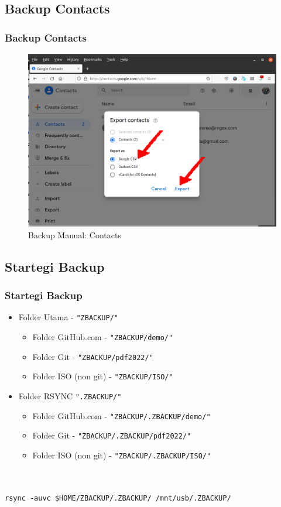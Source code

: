 \documentclass[xcolor=table, notheorems, hyperref={pdfpagelabels=false}]{beamer}
\begin{document}
\begin{frame}[fragile]
\section{Backup Contacts}
\frametitle{Backup Contacts}
\begin{figure}
\includegraphics[width=0.91\linewidth]{Contacts}
\caption{Backup Manual: Contacts}
\end{figure}
\end{frame}

\begin{frame}[fragile]
\section{Startegi Backup}
\frametitle{Startegi Backup}
\begin{itemize}
\item Folder Utama - \texttt{"ZBACKUP/"}
\begin{itemize}
\item Folder GitHub.com - \texttt{"ZBACKUP/demo/"}
\item Folder Git - \texttt{"ZBACKUP/pdf2022/"}
\item Folder ISO (non git) - \texttt{"ZBACKUP/ISO/"}
\end{itemize}
\item Folder RSYNC \texttt{".ZBACKUP/"}
\begin{itemize}
\item Folder GitHub.com - \texttt{"ZBACKUP/.ZBACKUP/demo/"}
\item Folder Git - \texttt{"ZBACKUP/.ZBACKUP/pdf2022/"}
\item Folder ISO (non git) - \texttt{"ZBACKUP/.ZBACKUP/ISO/"}
\end{itemize}
\end{itemize}
\begin{lstlisting}[basicstyle=\ttfamily\large]


rsync -auvc $HOME/ZBACKUP/.ZBACKUP/ /mnt/usb/.ZBACKUP/

\end{lstlisting}
\end{frame}
\end{document}
